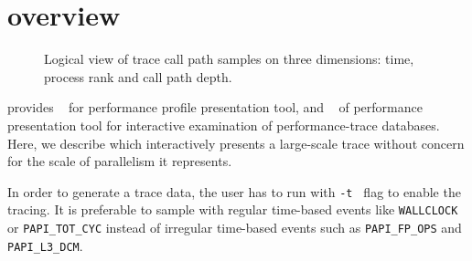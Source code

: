 


\newcommand{\traceview}{Trace view}
\newcommand{\depthview}{Depth view}
\newcommand{\miniview}{Mini map view}
\newcommand{\callview}{Call path view}



\section{\hpctraceviewer{} overview}

\begin{figure}[t]
\caption{Logical view of trace call path samples on three dimensions: time, process rank and call path depth.}
\label{fig:hpctraceviewer-callpath}
\end{figure}

\HPCToolkit{} provides \hpcviewer{}~\cite{Adhianto-MC-Ta:2010:PSTI-hpcviewer} for performance profile presentation tool, and \hpctraceviewer{}~\cite{Tallent-MC-etal:2011:hpctoolkit-scalable-tracing} of performance presentation tool for interactive examination of performance-trace databases.
Here, we describe \hpctraceviewer{} which interactively presents a large-scale trace without concern for the scale of parallelism it represents.

In order to generate a trace data, the user has to run \hpcrun{} with {\tt -t } flag to enable the tracing. It is preferable to sample with regular time-based events like {\tt WALLCLOCK} or {\tt PAPI\_TOT\_CYC} instead of irregular time-based events such as {\tt PAPI\_FP\_OPS} and {\tt PAPI\_L3\_DCM}.

